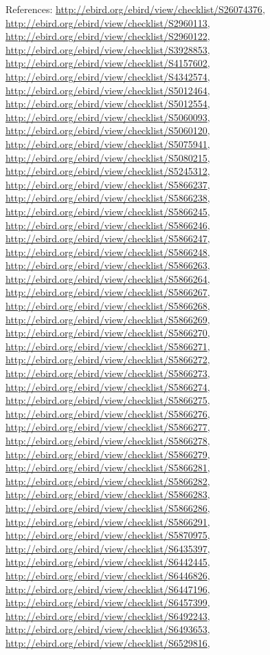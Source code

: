 \documentclass[9pt, article]{memoir}
\begin{document}
\begin{multicols}{2}
References: 
\url{http://ebird.org/ebird/view/checklist/S26074376}, 
\url{http://ebird.org/ebird/view/checklist/S2960113}, 
\url{http://ebird.org/ebird/view/checklist/S2960122}, 
\url{http://ebird.org/ebird/view/checklist/S3928853}, 
\url{http://ebird.org/ebird/view/checklist/S4157602}, 
\url{http://ebird.org/ebird/view/checklist/S4342574}, 
\url{http://ebird.org/ebird/view/checklist/S5012464}, 
\url{http://ebird.org/ebird/view/checklist/S5012554}, 
\url{http://ebird.org/ebird/view/checklist/S5060093}, 
\url{http://ebird.org/ebird/view/checklist/S5060120}, 
\url{http://ebird.org/ebird/view/checklist/S5075941}, 
\url{http://ebird.org/ebird/view/checklist/S5080215}, 
\url{http://ebird.org/ebird/view/checklist/S5245312}, 
\url{http://ebird.org/ebird/view/checklist/S5866237}, 
\url{http://ebird.org/ebird/view/checklist/S5866238}, 
\url{http://ebird.org/ebird/view/checklist/S5866245}, 
\url{http://ebird.org/ebird/view/checklist/S5866246}, 
\url{http://ebird.org/ebird/view/checklist/S5866247}, 
\url{http://ebird.org/ebird/view/checklist/S5866248}, 
\url{http://ebird.org/ebird/view/checklist/S5866263}, 
\url{http://ebird.org/ebird/view/checklist/S5866264}, 
\url{http://ebird.org/ebird/view/checklist/S5866267}, 
\url{http://ebird.org/ebird/view/checklist/S5866268}, 
\url{http://ebird.org/ebird/view/checklist/S5866269}, 
\url{http://ebird.org/ebird/view/checklist/S5866270}, 
\url{http://ebird.org/ebird/view/checklist/S5866271}, 
\url{http://ebird.org/ebird/view/checklist/S5866272}, 
\url{http://ebird.org/ebird/view/checklist/S5866273}, 
\url{http://ebird.org/ebird/view/checklist/S5866274}, 
\url{http://ebird.org/ebird/view/checklist/S5866275}, 
\url{http://ebird.org/ebird/view/checklist/S5866276}, 
\url{http://ebird.org/ebird/view/checklist/S5866277}, 
\url{http://ebird.org/ebird/view/checklist/S5866278}, 
\url{http://ebird.org/ebird/view/checklist/S5866279}, 
\url{http://ebird.org/ebird/view/checklist/S5866281}, 
\url{http://ebird.org/ebird/view/checklist/S5866282}, 
\url{http://ebird.org/ebird/view/checklist/S5866283}, 
\url{http://ebird.org/ebird/view/checklist/S5866286}, 
\url{http://ebird.org/ebird/view/checklist/S5866291}, 
\url{http://ebird.org/ebird/view/checklist/S5870975}, 
\url{http://ebird.org/ebird/view/checklist/S6435397}, 
\url{http://ebird.org/ebird/view/checklist/S6442445}, 
\url{http://ebird.org/ebird/view/checklist/S6446826}, 
\url{http://ebird.org/ebird/view/checklist/S6447196}, 
\url{http://ebird.org/ebird/view/checklist/S6457399}, 
\url{http://ebird.org/ebird/view/checklist/S6492243}, 
\url{http://ebird.org/ebird/view/checklist/S6493653}, 
\url{http://ebird.org/ebird/view/checklist/S6529816}, 

\end{multicols}
\end{document}
